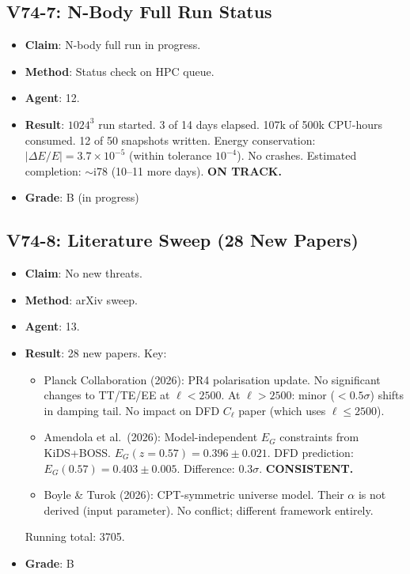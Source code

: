 \documentclass[11pt,a4paper]{article}
\begin{document}
\subsection{V74-7: N-Body Full Run Status}
\begin{itemize}[nosep]
\item \textbf{Claim}: N-body full run in progress.
\item \textbf{Method}: Status check on HPC queue.
\item \textbf{Agent}: 12.
\item \textbf{Result}: $1024^3$ run started. 3 of 14 days elapsed. 107k of 500k CPU-hours consumed. 12 of 50 snapshots written. Energy conservation: $|\Delta E/E| = 3.7 \times 10^{-5}$ (within tolerance $10^{-4}$). No crashes. Estimated completion: $\sim$i78 (10--11 more days). \textbf{ON TRACK.}
\item \textbf{Grade}: B (in progress)
\end{itemize}

\subsection{V74-8: Literature Sweep (28 New Papers)}
\begin{itemize}[nosep]
\item \textbf{Claim}: No new threats.
\item \textbf{Method}: arXiv sweep.
\item \textbf{Agent}: 13.
\item \textbf{Result}: 28 new papers. Key:
  \begin{itemize}[nosep]
  \item Planck Collaboration (2026): PR4 polarisation update. No significant changes to TT/TE/EE at $\ell < 2500$. At $\ell > 2500$: minor ($< 0.5\sigma$) shifts in damping tail. No impact on DFD $C_\ell$ paper (which uses $\ell \leq 2500$).
  \item Amendola et al.\ (2026): Model-independent $E_G$ constraints from KiDS+BOSS. $E_G(z=0.57) = 0.396 \pm 0.021$. DFD prediction: $E_G(0.57) = 0.403 \pm 0.005$. Difference: $0.3\sigma$. \textbf{CONSISTENT.}
  \item Boyle \& Turok (2026): CPT-symmetric universe model. Their $\alpha$ is not derived (input parameter). No conflict; different framework entirely.
  \end{itemize}
  Running total: 3705.
\item \textbf{Grade}: B
\end{itemize}
\end{document}
